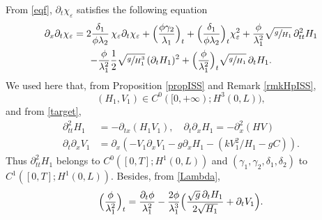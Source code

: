 From \eqref{eqf},
$\partial_{t}\chi_{\varepsilon}$ satisfies the following equation
\begin{multline}
\label{eqdtf}
\partial_{x}\partial_{t}\chi_{\varepsilon}=2\frac{\delta_{1}}{\phi\lambda_{2}}\,\chi_{\varepsilon}\partial_{t}\chi_{\varepsilon}+\Bigl(\frac{\phi\gamma_{2}}{\lambda_{1}} \Bigr)_{t}+ \Bigl(\frac{\delta_{1}}{\phi\lambda_{2}} \Bigr)_{t}\chi^{2}_{\varepsilon}
+{\frac{\phi}{\lambda_{1}^{2}}}\sqrt{\sfrac{g}{H_{1}}}\,\partial_{tt}^{2} H_{1}\\
-{\frac{\phi}{\lambda_{1}^{2}}}\frac{1}{2}\sqrt{\sfrac{g}{H_{1}^{3}}}\,(\partial_{t}H_{1})^{2}+{\Bigl(\frac{\phi}{\lambda_{1}^{2}} \Bigr)_{t}\sqrt{\sfrac{g}{H_{1}}}\,\partial_{t} H_{1}}.
\end{multline}
We used here that, from Proposition \ref{propISS} and Remark \ref{rmkHpISS},
\[
(H_{1},V_{1})\in C^{0}([0,+\infty); H^{3}(0,L)),
\]
and from \eqref{target},
\begin{align*}
\partial_{tt}^{2}H_{1} &= -\partial_{tx}(H_{1}V_{1}), \quad\partial_{t}\partial_{x}H_{1}=-\partial_{x}^{2}(HV)\\
\tag*{and}
\partial_{t}\partial_{x}V_{1}&=\partial_{x}\left(-V_{1}\partial_{x}V_{1}-g\partial_{x}H_{1}-(kV_{1}^{2}/H_{1}-gC)\right).
\end{align*}
Thus $\partial_{tt}^{2}H_{1}$ belongs to $C^{0}([0,T]; H^{1}(0,L))$ and $(\gamma_{1}, \gamma_{2},\delta_{1},\delta_{2})$ to $C^{1}([0,T]; H^{1}(0,L))$. Besides, from \eqref{Lambda},
\begin{equation*}
\Bigl(\frac{\phi}{\lambda_{1}^{2}} \Bigr)_{t} = \frac{\partial_{t}\phi}{\lambda_{1}^{2}}-\frac{2\phi}{\lambda_{1}^{3}} \Bigl(\frac{{\sqrt{g}}\,\partial_{t}H_{1}}{2\sqrt{H_{1}}}+\partial_{t}V_{1} \Bigr).
\end{equation*}

